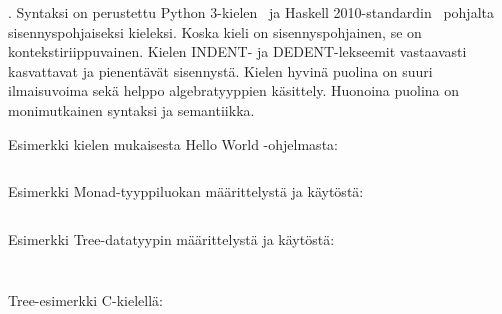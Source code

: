 
\bnfdescription.
Syntaksi on perustettu
Python 3-kielen~\citep{pythonsyntax} ja Haskell
2010-standardin~\citep{haskellsyntax} pohjalta sisennyspohjaiseksi kieleksi.
Koska kieli on sisennyspohjainen, se on kontekstiriippuvainen. Kielen INDENT-
ja DEDENT-lekseemit vastaavasti kasvattavat ja pienentävät sisennystä. Kielen
hyvinä puolina on suuri ilmaisuvoima sekä helppo algebratyyppien käsittely.
Huonoina puolina on monimutkainen syntaksi ja semantiikka.

 \newpage
{} \newpage
{}

Esimerkki kielen mukaisesta Hello World -ohjelmasta:

\def\mylexer{kieli_lexer.py:KieliLexer -x}
\inputminted{\mylexer}{example.kieli}

Esimerkki Monad-tyyppiluokan määrittelystä ja käytöstä:

\inputminted{\mylexer}{monad.kieli}

\newpage

Esimerkki Tree-datatyypin määrittelystä ja käytöstä:

\inputminted{\mylexer}{tree.kieli}
\inputminted{text}{tree-output}
\newpage

Tree-esimerkki C-kielellä:

\inputminted{C}{tree.c}
